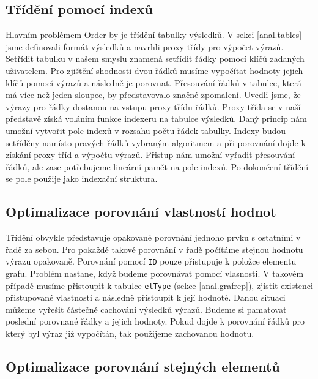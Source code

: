 \subsection{Třídění pomocí indexů}

Hlavním problémem Order by je třídění tabulky výsledků.
V sekci \ref{anal.tables} jsme definovali formát výsledků a navrhli proxy třídy pro výpočet výrazů.
Setřídit tabulku v našem smyslu znamená setřídit řádky pomocí klíčů zadaných uživatelem.
Pro zjištění shodnosti dvou řádků musíme vypočítat hodnoty jejich klíčů pomocí výrazů a následně je porovnat.
Přesouvání řádků v tabulce, která má více než jeden sloupec, by představovalo značné zpomalení.
Uvedli jsme, že výrazy pro řádky dostanou na vstupu proxy třídu řádků.
Proxy třída se v naší představě získá voláním funkce indexeru na tabulce výsledků.
Daný princip nám umožní vytvořit pole indexů v rozsahu počtu řádek tabulky.
Indexy budou setříděny namísto pravých řádků vybraným algoritmem a při porovnání dojde k získání proxy tříd a výpočtu výrazů.
Přistup nám umožní vyřadit přesouvání řádků, ale zase potřebujeme lineární pamět na pole indexů.
Po dokončení třídění se pole použije jako indexační struktura.

\subsection{Optimalizace porovnání vlastností hodnot} \label{anal.orderby.opt1}

Třídění obvykle představuje opakované porovnání jednoho prvku s ostatními v řadě za sebou.
Pro pokaždé takové porovnání v řadě počítáme stejnou hodnotu výrazu opakovaně.
Porovnání pomocí \texttt{ID} pouze přistupuje k položce elementu grafu.
Problém nastane, když budeme porovnávat pomocí vlasnosti.
V takovém případě musíme přistoupit k tabulce \texttt{elType} (sekce \ref{anal.grafrep}), zjistit existenci přistupované vlastnosti a následně přistoupit k její hodnotě.
Danou situaci můžeme vyřešit částečně cachování výsledků výrazů.
Budeme si pamatovat poslední porovnané řádky a jejich hodnoty.
Pokud dojde k porovnání řádků pro který byl výraz již vypočítán, tak použijeme zachovanou hodnotu.

\subsection{Optimalizace porovnání stejných elementů} \label{anal.orderby.opt2}

